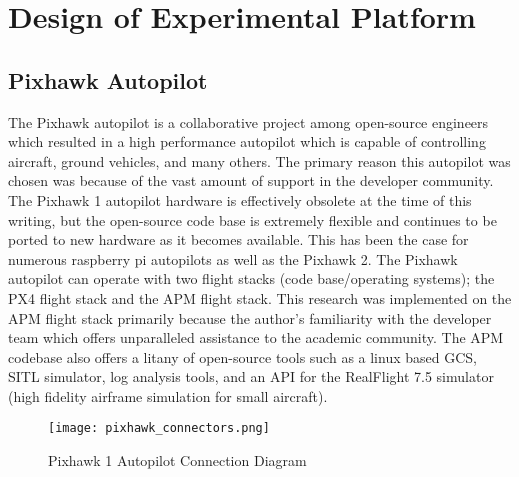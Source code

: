 \chapter{Design of Experimental Platform}\label{ch:platform}

\section{Pixhawk Autopilot}
The Pixhawk autopilot is a collaborative project among open-source engineers which resulted in a high performance autopilot which is capable of controlling aircraft, ground vehicles, and many others.  The primary reason this autopilot was chosen was because of the vast amount of support in the developer community.  The Pixhawk 1 autopilot hardware is effectively obsolete at the time of this writing, but the open-source code base is extremely flexible and continues to be ported to new hardware as it becomes available.  This has been the case for numerous raspberry pi autopilots as well as the Pixhawk 2.  The Pixhawk autopilot can operate with two flight stacks (code base/operating systems); the PX4 flight stack and the \ac{APM} flight stack.  This research was implemented on the \ac{APM} flight stack primarily because the author's familiarity with the developer team which offers unparalleled assistance to the academic community.  The \ac{APM} codebase also offers a litany of open-source tools such as a linux based \ac{GCS}, \ac{SITL} simulator, log analysis tools, and an \ac{API} for the RealFlight 7.5 simulator (high fidelity airframe simulation for small aircraft).

\begin{figure}[h!]
 \centering
  \texttt{[image: pixhawk\_connectors.png]}
  \caption{Pixhawk 1 Autopilot Connection Diagram}
  \label{fig:pixhawk_autopilot}
\end{figure}

